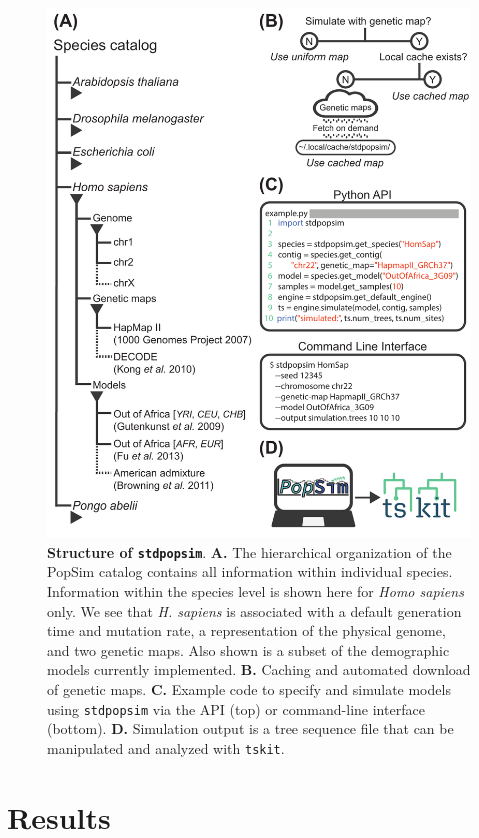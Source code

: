 \documentclass[12pt,halfline,a4paper]{ouparticle}
\newcommand{\stdpopsim}{\texttt{stdpopsim}\xspace}
\newcommand{\tskit}{\texttt{tskit}\xspace}
\begin{document}
\begin{figure}[t]
\begin{center}
\includegraphics[width=0.5\linewidth]{display_items/Figure1.pdf}
\caption{\textbf{Structure of \stdpopsim}. \textbf{A.} The
hierarchical organization of the PopSim catalog contains all information
within individual species. Information within the species level is shown here
for \emph{Homo sapiens} only. We see that \emph{H. sapiens} is associated
with a default generation time and mutation rate,
a representation of the physical genome, and two genetic maps. Also shown is a
subset of the demographic models currently implemented. \textbf{B.} Caching
and automated download of genetic maps. \textbf{C.} Example code to specify
and simulate models using \stdpopsim via the API (top) or
command-line interface (bottom). \textbf{D.} Simulation output
is a tree sequence file that can
be manipulated and analyzed with \tskit.}
\label{fig:cartoon}
\end{center}
\end{figure}

\section*{Results}
\end{document}

